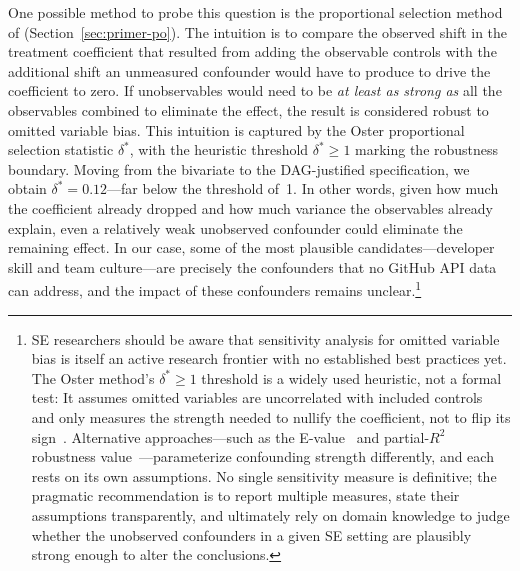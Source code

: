 One possible method to probe this question is the proportional selection method of \citet{oster2019unobservable} (Section~\ref{sec:primer-po}).
The intuition is to compare the observed shift in the treatment coefficient that resulted from adding the observable controls with the additional shift an unmeasured confounder would have to produce to drive the coefficient to zero.
If unobservables would need to be \emph{at least as strong as} all the observables combined to eliminate the effect, the result is considered robust to omitted variable bias.
This intuition is captured by the Oster proportional selection statistic $\delta^*$, with the heuristic threshold $\delta^* \geq 1$ marking the robustness boundary.
Moving from the bivariate to the DAG-justified specification, we obtain $\delta^* = 0.12$---far below the threshold of~1.
In other words, given how much the coefficient already dropped and how much variance the observables already explain, even a relatively weak unobserved confounder could eliminate the remaining effect.
In our case, some of the most plausible candidates---developer skill and team culture---are precisely the confounders that no GitHub API data can address, and the impact of these confounders remains unclear.\footnote{SE researchers should be aware that sensitivity analysis for omitted variable bias is itself an active research frontier with no established best practices yet.
The Oster method's $\delta^* \geq 1$ threshold is a widely used heuristic, not a formal test: It assumes omitted variables are uncorrelated with included controls~\cite{diegert2026endogenous} and only measures the strength needed to nullify the coefficient, not to flip its sign~\cite{masten2025sign}.
Alternative approaches---such as the E-value~\cite{vanderweele2017sensitivity} and partial-$R^2$ robustness value~\cite{cinelli2020making}---parameterize confounding strength differently, and each rests on its own assumptions.
No single sensitivity measure is definitive; the pragmatic recommendation is to report multiple measures, state their assumptions transparently, and ultimately rely on domain knowledge to judge whether the unobserved confounders in a given SE setting are plausibly strong enough to alter the conclusions.}

